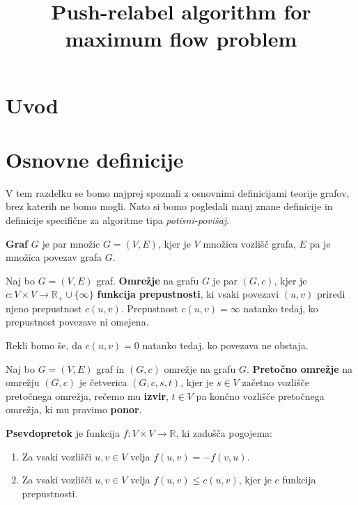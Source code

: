 \documentclass[mat1]{fmfdelo}
\title{Push-relabel algorithm for maximum flow problem}
\begin{document}
\section{Uvod}


\section{Osnovne definicije}

V tem razdelku se bomo najprej spoznali z osnovnimi definicijami teorije grafov, brez katerih ne bomo mogli. Nato si bomo pogledali manj znane definicije in definicije specifične za algoritme tipa \textit{potisni-povišaj}.

\begin{definicija}
\textbf{Graf} $G$ je par množic $G = (V,E)$, kjer je $V$ množica vozlišč grafa, $E$ pa je množica povezav grafa $G$.
\end{definicija}

\begin{definicija}
Naj bo $G = (V, E)$ graf. \textbf{Omrežje} na grafu $G$ je par $(G, c)$, kjer je $c \colon V \times V \rightarrow \mathbb{R}_+ \cup \{\infty\}$ \textbf{funkcija prepustnosti}, ki vsaki povezavi $(u,v)$ priredi njeno prepustnost $c(u,v)$. Prepustnost $c(u,v) = \infty$ natanko tedaj, ko prepustnost povezave ni omejena.
\end{definicija}

Rekli bomo še, da $c(u,v)=0$ natanko tedaj, ko povezava ne obstaja.

\begin{definicija}
Naj bo $G = (V,E)$ graf in $(G,c)$ omrežje na grafu $G$. \textbf{Pretočno omrežje} na omrežju $(G,c)$ je četverica $(G,c,s,t)$, kjer je $s\in V$ začetno vozlišče pretočnega omrežja, rečemo mu \textbf{izvir}, $t\in V$ pa končno vozlišče pretočnega omrežja, ki mu pravimo \textbf{ponor}.
\end{definicija}

\begin{definicija} \label{def:psevdopretok}
\textbf{Psevdopretok} je funkcija $f \colon V \times V \rightarrow \mathbb{R}$, ki zadošča pogojema:
\begin{enumerate}
\item Za vsaki vozlišči $u,v \in V$ velja $f(u,v) = - f(v,u)$.
\item Za vsaki vozlišči $u,v \in V$ velja $f(u,v) \leq c(u,v)$, kjer je $c$ funkcija prepustnosti.
\end{enumerate}
\end{definicija}
\end{document}
